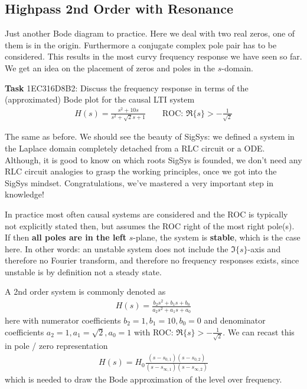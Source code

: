 \subsection{Highpass 2nd Order with Resonance}
\label{sec:1EC316D8B2}
\begin{Ziel}
Just another Bode diagram to practice. Here we deal with two real zeros,
one of them is in the origin. Furthermore a conjugate complex pole pair has to be
considered. This results in the most curvy frequency response we have seen so far.
We get an idea on the placement of zeros and poles in the $s$-domain.
\end{Ziel}
\textbf{Task} {\tiny 1EC316D8B2}:  Discuss the frequency response in terms
of the (approximated) Bode plot for the causal LTI system
\begin{align}
H(s) = \frac{s^2+10 s}{s^2+\sqrt{2} s +1}\qquad\text{ROC: }
\Re\{s\}>-\frac{1}{\sqrt{2}}
\end{align}
\begin{Werkzeug}
The same as before. We should see the beauty of SigSys: we defined a system
in the Laplace domain completely detached from a RLC circuit or a ODE.
Although, it is good to know on which roots SigSys is founded, we don't need
any RLC circuit analogies to grasp the working principles, once we got into the
SigSys mindset. Congratulations, we've mastered a very important step in knowledge!
\end{Werkzeug}
\begin{Ansatz}
In practice most often causal systems are considered and the ROC is typically
not explicitly stated then, but assumes the ROC right of the most right pole(s).
If then \textbf{all poles are in the left} $s$-plane, the system is \textbf{stable},
which is the case here.
In other words: an unstable system does not include the $\Im\{s\}$-axis and therefore
no Fourier transform, and therefore no frequency responses exists, since unstable
is by definition not a steady state.

A 2nd order system is commonly denoted as
\begin{align}
H(s) = \frac{b_2 s^2+b_1 s + b_0}{a_2 s^2+a_1 s +a_0}
\end{align}
here with numerator coefficients $b_2 = 1, b_1 = 10, b_0=0$ and denominator
coefficients
$a_2 = 1, a_1 = \sqrt{2}, a_0=1$ with ROC: $\Re\{s\}>-\frac{1}{\sqrt{2}}$.
We can recast this in pole / zero representation
\begin{align}
H(s) = H_0\frac{(s-s_{0,1}) (s-s_{0,2})}{(s-s_{\infty,1})(s-s_{\infty,2})}
\end{align}
which is needed to draw the Bode approximation of the level over frequency.
\end{Ansatz}
